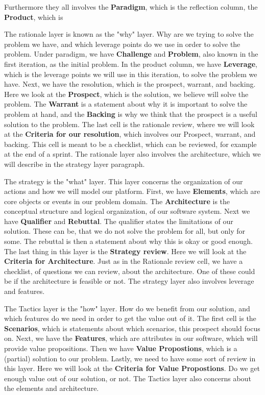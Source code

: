 Furthermore they all involves the \textbf{Paradigm}, which is the reflection column, the \textbf{Product}, which is 

The rationale layer is known as the "why" layer.
Why are we trying to solve the problem we have, and which leverage points do we use in order to solve the problem.
Under paradigm, we have \textbf{Challenge} and \textbf{Problem}, also known in the first iteration, as the initial problem.
In the product column, we have \textbf{Leverage}, which is the leverage points we will use in this iteration, to solve the problem we have.
Next, we have the resolution, which is the prospect, warrant, and backing. 
Here we look at the \textbf{Prospect}, which is the solution, we believe will solve the problem.
The \textbf{Warrant} is a statement about why it is important to solve the problem at hand, and the \textbf{Backing} is why we think that the prospect is a useful solution to the problem.
The last cell is the rationale review, where we will look at the \textbf{Criteria for our resolution}, which involves our Prospect, warrant, and backing.
This cell is meant to be a checklist, which can be reviewed, for example at the end of a sprint.
The rationale layer also involves the architecture, which we will describe in the strategy layer paragraph.

The strategy is the "what" layer.
This layer concerns the organization of our actions and how we will model our platform.
First, we have \textbf{Elements}, which are core objects or events in our problem domain.
The \textbf{Architecture} is the conceptual structure and logical organization, of our software system.
Next we have \textbf{Qualifier} and \textbf{Rebuttal}.
The qualifier states the limitations of our solution.
These can be, that we do not solve the problem for all, but only for some.
The rebuttal is then a statement about why this is okay or good enough.
The last thing in this layer is the \textbf{Strategy review}.
Here we will look at the \textbf{Criteria for Architecture}.
Just as in the Rationale review cell, we have a checklist, of questions we can review, about the architecture.
One of these could be if the architecture is feasible or not.
The strategy layer also involves leverage and features.

The Tactics layer is the "how" layer.
How do we benefit from our solution, and which features do we need in order to get the value out of it.
The first cell is the \textbf{Scenarios}, which is statements about which scenarios, this prospect should focus on.
Next, we have the \textbf{Features}, which are attributes in our software, which will provide value propositions.
Then we have \textbf{Value Propostions}, which is a (partial) solution to our problem.
Lastly, we need to have some sort of review in this layer.
Here we will look at the \textbf{Criteria for Value Propostions}.
Do we get enough value out of our solution, or not.
The Tactics layer also concerns about the elements and architecture.

